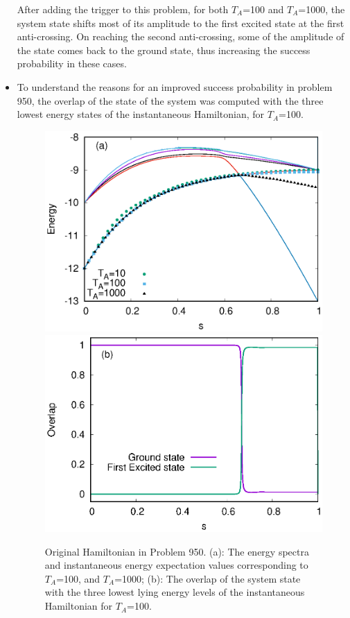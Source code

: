 \documentclass[../main.tex]{subfiles}
\begin{document}
\begin{itemize}
After adding the trigger to this problem, for both $T_A$=100 and $T_A$=1000, the system state shifts most of its amplitude to the first excited state at the first anti-crossing. On reaching the second anti-crossing, some of the amplitude of the state comes back to the ground state, thus increasing the success probability in these cases.

\item To understand the reasons for an improved success probability in problem 950, the overlap of the state of the system was computed with the three lowest energy states of the instantaneous Hamiltonian, for $T_A$=100. 

\begin{figure}
\centering
  \includegraphics[scale=0.8]{950a_s12_O.eps}
  \includegraphics[scale=0.8]{950_Overlap_Orig.eps}
  \caption{Original Hamiltonian in Problem 950. (a): The energy spectra and instantaneous energy expectation values corresponding to $T_A$=100, and $T_A$=1000; (b): The overlap of the system state with the three lowest lying energy levels of the instantaneous Hamiltonian for $T_A$=100.}
  \label{fig:a30}
 \end{figure}
 

\end{itemize}
\end{document}
